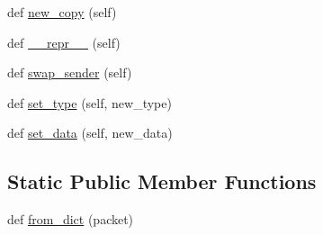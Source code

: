 \begin{DoxyCompactItemize}
\item 
def \hyperlink{classparlai_1_1mturk_1_1core_1_1legacy__2018_1_1socket__manager_1_1Packet_aabcd943398680a33c0a313da2ec1a767}{new\+\_\+copy} (self)
\item 
def \hyperlink{classparlai_1_1mturk_1_1core_1_1legacy__2018_1_1socket__manager_1_1Packet_ab584329eae3598c36a1ae14a58be7e72}{\+\_\+\+\_\+repr\+\_\+\+\_\+} (self)
\item 
def \hyperlink{classparlai_1_1mturk_1_1core_1_1legacy__2018_1_1socket__manager_1_1Packet_ab8d13db3d0ac97cb33114593eb47d054}{swap\+\_\+sender} (self)
\item 
def \hyperlink{classparlai_1_1mturk_1_1core_1_1legacy__2018_1_1socket__manager_1_1Packet_a268873d6b357e25768ce83ed2ad605f6}{set\+\_\+type} (self, new\+\_\+type)
\item 
def \hyperlink{classparlai_1_1mturk_1_1core_1_1legacy__2018_1_1socket__manager_1_1Packet_a3e06e555eadd65177cea1346992cf9b8}{set\+\_\+data} (self, new\+\_\+data)
\end{DoxyCompactItemize}
\subsection*{Static Public Member Functions}
\begin{DoxyCompactItemize}
\item 
def \hyperlink{classparlai_1_1mturk_1_1core_1_1legacy__2018_1_1socket__manager_1_1Packet_a4ff11eed0eea4dcf2454533758f88a85}{from\+\_\+dict} (packet)
\end{DoxyCompactItemize}
